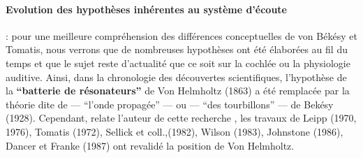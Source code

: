 \paragraph{Evolution des hypothèses inhérentes au système d'écoute}:
pour une meilleure compréhension des différences conceptuelles de von Békésy et Tomatis, nous 
verrons que de nombreuses  hypothèses ont été élaborées au fil du temps et que le sujet reste 
d'actualité que ce soit sur la cochlée ou  la physiologie auditive. %
Ainsi, dans la chronologie des découvertes scientifiques,  l'hypothèse de la \textbf{``batterie de
	résonateurs''}  de Von Helmholtz (1863)  a été remplacée par la
théorie dite de  --- ``l'onde propagée'' --- ou --- ``des
tourbillons'' ---  de Bekésy (1928).
Cependant, relate l'auteur de cette recherche \autocite[24--28] {auriol:cle}, les travaux de Leipp (1970, 
1976), Tomatis (1972), Sellick 
et coll.,(1982), Wilson (1983),
Johnstone (1986), Dancer et
Franke (1987) ont revalidé la position de Von Helmholtz.

